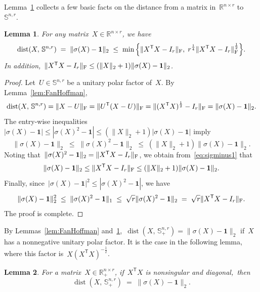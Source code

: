 \documentclass[11pt,a4paper]{article}  %
\newtheorem{lemma}{Lemma}%
\theoremstyle{definition}
\DeclareMathOperator{\dist}{dist}
\newcommand{\RR}{\mathbb{R}}
\newcommand{\col}{r}
\newcommand{\stf}[1]{\mathbb{S}^{#1}}
\newcommand{\fro}{{\scriptstyle{\textnormal{F}}}}
\newcommand{\trs}{{\scriptstyle{\mathsf{T}}}}
\newcommand{\ones}{\mathbf{1}}
\begin{document}
Lemma~\ref{lem:distm} collects a few basic facts on the distance from a matrix in~$\RR^{n\times \col}$ to~$\stf{n,\col}$.
\begin{lemma}
    \label{lem:distm}
    For any matrix~$X\in\RR^{n\times \col}$, we have
    \begin{equation}
        \nonumber
    \dist(X,\,\stf{n, \col}) \;=\;  \|\sigma(X) - \ones\|_2 \;\le\;
    \min\Big\{\|X^\trs X - I_\col\|_\fro, \; \col^{\frac{1}{4}}\|X^\trs X - I_\col\|_\fro^{\frac{1}{2}}\Big\}.
    \end{equation}
In addition,~$\|X^\trs X - I_\col\|_\fro \le (\|X\|_2+1)\|\sigma(X) - \ones\|_2$.
\end{lemma}
\begin{proof}
        Let~$U\in\stf{n,\col}$ be a unitary polar factor of~$X$. By Lemma~\ref{lem:FanHoffman},
    \begin{equation}
        \nonumber
    \dist(X,\, \stf{n,\col})
    = \|X - U\|_\fro
    = \|U^\trs (X - U)\|_\fro
    = \|(X^\trs X)^{\frac{1}{2}} - I_\col\|_\fro
    = \|\sigma(X) - \ones\|_2.
    \end{equation}
        The entry-wise inequalities~$|\sigma(X) -\ones| \le |\sigma(X)^2 -\ones| \le (\|X\|_2+1)|\sigma(X) -\ones|$ imply
    \begin{equation}
    \label{eq:sigminus1}
    \|\sigma(X) -\ones\|_2 \;\le\; \|\sigma(X)^2 - \ones\|_2
    \;\le\; (\|X\|_2+1)\|\sigma(X) -\ones\|_2.
    \end{equation}
    Noting that~$\|\sigma(X)^2 -\ones\|_2 = \|X^\trs X-I_\col\|_\fro$, we obtain from~\eqref{eq:sigminus1}
    that
    \begin{equation*}
        \|\sigma(X) -\ones\|_2 \le\|X^\trs X-I_\col\|_\fro \le(\|X\|_2+1)\|\sigma(X) - \ones\|_2.
    \end{equation*}
    Finally, since~$|\sigma(X) -\ones|^2 \le |\sigma(X)^2 -\ones|$, we have
    \begin{equation}
    \nonumber
        \|\sigma(X) -\ones\|_2^2 \;\le\; \|\sigma(X)^2 - \ones\|_1
    \;\le\; \sqrt{\col} \|\sigma(X)^2 - \ones\|_2 \;=\; \sqrt{\col} \|X^\trs X -I_\col\|_\fro.
    \end{equation}
    The proof is complete.
\end{proof}


By Lemmas~\ref{lem:FanHoffman} and~\ref{lem:distm},~$\dist(X,\, \stf{n,\col}_+) = \|\sigma(X) - \ones\|_2$
if~$X$ has a nonnegative unitary polar factor.
It is the case in the following lemma, where this factor is~$X(X^\trs X)^{-\frac{1}{2}}$.%
\begin{lemma}
    \label{lem:diag}
    For a matrix~$X\in\RR^{n\times \col}_+$, if~$X^\trs X$ is nonsingular and diagonal,~then%
\begin{equation}
    \nonumber
    \dist(X,\, \stf{n,\col}_+) \;=\; \|\sigma(X) - \ones\|_2.
\end{equation}
\end{lemma}
\end{document}
